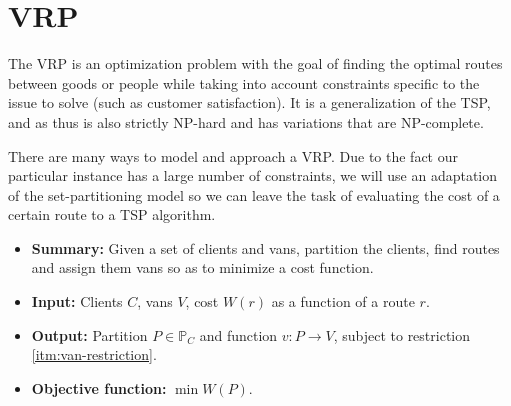 \section{\texorpdfstring{\Acrlong*{VRP}}{Vehicle routing problem}} \label{algorithm-vrp}
The \acrfull*{VRP} is an optimization problem with the goal of finding the optimal routes between goods or people while taking into account constraints specific to the issue to solve (such as customer satisfaction). It is a generalization of the \acrshort{TSP}, and as thus is also strictly NP-hard and has variations that are NP-complete.\par
There are many ways to model and approach a \acrshort{VRP}. Due to the fact our particular instance has a large number of constraints, we will use an adaptation of the set-partitioning model \cite[p.~21-22]{optimal-vrp} so we can leave the task of evaluating the cost of a certain route to a \acrshort{TSP} algorithm.\par

\begin{itemize}
    \item \textbf{Summary:} Given a set of clients and vans, partition the clients, find routes and assign them vans so as to minimize a cost function.
    \item \textbf{Input:} Clients $C$, vans $V$, cost $W(r)$ as a function of a route $r$.
    \item \textbf{Output:} Partition $P \in \mathbb{P}_C$ and function $v\colon P \rightarrow V$, subject to restriction \ref{itm:van-restriction}.
    \item \textbf{Objective function:} $\min W(P)$.
\end{itemize}




